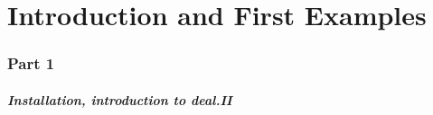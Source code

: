 \part{Introduction and First Examples}
\section*{Part 1}
\begin{frame}
  \frametitle{Installation, introduction to deal.II}
  \tableofcontents[hideallsubsections]

  \vfill
  
  \hypertarget{part1}{}
  \hyperlink{part2}{}
  \hyperlink{part3}{}
\end{frame}


%





%

